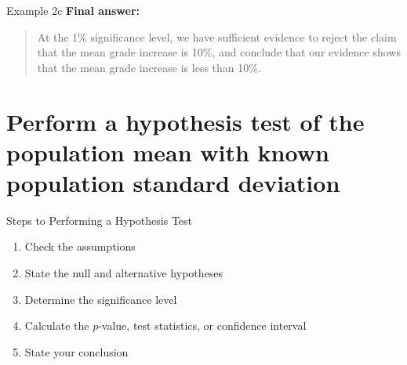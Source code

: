 \documentclass[t]{beamer}
\begin{document}
\begin{frame}{Example 2c}
\textbf{Final answer:}
\begin{quote}
At the 1\% significance level, we have sufficient evidence to reject the claim that the mean grade increase is 10\%, and conclude that our evidence shows that the mean grade increase is less than 10\%.
\end{quote}
\end{frame}

\section{Perform a hypothesis test of the population mean with known population standard deviation}

\begin{frame}{Steps to Performing a Hypothesis Test}
\begin{enumerate}
	\item Check the assumptions
	\item<2-> State the null and alternative hypotheses
	\item<3-> Determine the significance level
	\item<4-> Calculate the $p$-value, test statistics, or confidence interval
	\item<5-> State your conclusion
\end{enumerate}
\end{frame}

\end{document}
